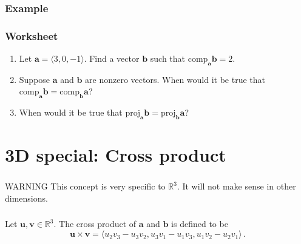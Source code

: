 \documentclass[aspectratio=169]{beamer}
\newcommand{\vectorproj}[2][]{\mathrm{proj}_{\vect{#1}}\vect{#2}}
\newcommand{\vectorcomp}[2][]{\mathrm{comp}_{\vect{#1}}\vect{#2}}
\newcommand{\vect}{\mathbf}
\begin{document}
\begin{frame}
    \frametitle{Example}

\end{frame}

\begin{frame}
    \frametitle{Worksheet}
    \begin{enumerate}
        \item Let $\vect{a} = \langle 3,0,-1\rangle$. Find a vector
            $\vect{b}$ such that $\vectorcomp[a]{b} = 2$.
        \item
         Suppose $\vect{a}$ and $\vect{b}$ are nonzero vectors.
            When would it be true that $\vectorcomp[a]{b} = \vectorcomp[b]{a}$?
        \item When would it be true that 
                 $\vectorproj[a]{b} = \vectorproj[b]{a}$?
    \end{enumerate}
\end{frame}

\section{3D special: Cross product}

\begin{frame}
    \frametitle{\secname}
    \begin{block}{WARNING}
This concept is very specific to \(\mathbb{R}^3\).
It will not make sense in other dimensions.
    \end{block}
\end{frame}

\begin{frame}
    \frametitle{\secname}
\begin{definition}
Let \(\mathbf{u}, \mathbf{v} \in \mathbb{R}^3\).
The cross product of \(\mathbf{a}\) and \(\mathbf{b}\) is defined to be
\begin{equation*}
    \mathbf{u} \times \mathbf{v} = \langle u_2 v_3 - u_3 v_2, u_3v_1 - u_1 v_3, u_1v_2 - u_2v_1 \rangle \,.
\end{equation*}
\end{definition}
\end{frame}
  
\end{document}
